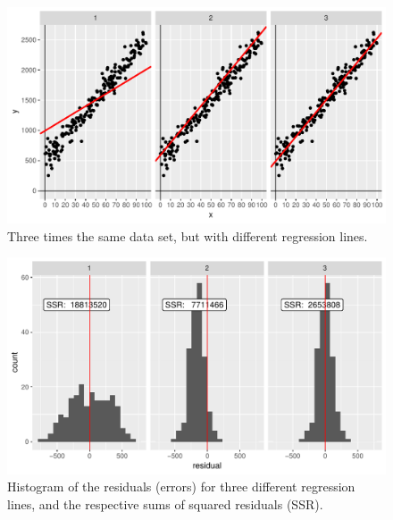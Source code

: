 \documentclass[]{book}\usepackage[]{graphicx}\usepackage[]{color}
\makeatletter
\def\maxwidth{ %
  \ifdim\Gin@nat@width>\linewidth
    \linewidth
  \else
    \Gin@nat@width
  \fi
}
\newenvironment{knitrout}{}{} %
\makeatother
\begin{document}
\begin{knitrout}
\color{fgcolor}\begin{figure}

{\centering \includegraphics[width=\maxwidth]{figure/lm_13-1} 

}

\caption[Three times the same data set, but with different regression lines]{Three times the same data set, but with different regression lines.}\label{fig:lm_13}
\end{figure}


\end{knitrout}

\begin{knitrout}
\color{fgcolor}\begin{figure}

{\centering \includegraphics[width=\maxwidth]{figure/lm_14-1} 

}

\caption[Histogram of the residuals (errors) for three different regression lines, and the respective sums of squared residuals (SSR)]{Histogram of the residuals (errors) for three different regression lines, and the respective sums of squared residuals (SSR).}\label{fig:lm_14}
\end{figure}


\end{knitrout}
\end{document}
